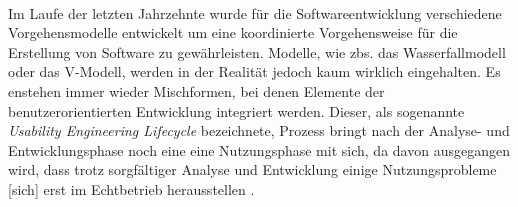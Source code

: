 \\
Im Laufe der letzten Jahrzehnte wurde für die Softwareentwicklung verschiedene Vorgehensmodelle entwickelt um eine koordinierte Vorgehensweise für die Erstellung von Software zu gewährleisten. Modelle, wie zbs. das Wasserfallmodell oder das V-Modell, werden in der Realität jedoch kaum wirklich eingehalten. Es enstehen immer wieder Mischformen, bei denen Elemente der benutzerorientierten Entwicklung integriert werden. Dieser, als sogenannte \textit{Usability Engineering Lifecycle} bezeichnete, Prozess bringt nach der Analyse- und Entwicklungsphase noch eine eine Nutzungsphase mit sich, da davon ausgegangen wird, dass \glqq trotz sorgfältiger Analyse und Entwicklung einige Nutzungsprobleme [sich] erst im Echtbetrieb herausstellen\grqq{} \cite{lifecycle}.






